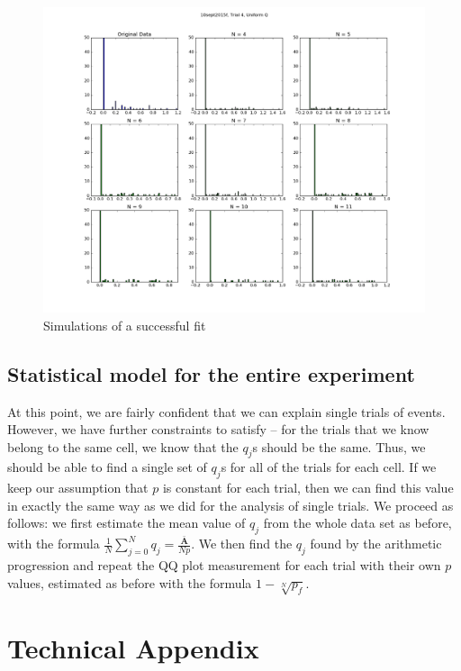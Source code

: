 \documentclass{article}
\newcommand{\rv}[1] {
\text{$\bm{#1}$}
}
\begin{document}
\begin{figure}[h]
  \centering
  \caption{Simulations of a successful fit}
  \includegraphics[width=1.0\textwidth]{10sept2015f-4-uq}
\end{figure}

\subsection{Statistical model for the entire experiment}
At this point, we are fairly confident that we can explain single trials of events. However, we have further constraints to satisfy -- for the trials that we know belong to the same cell, we know that the $q_j$s should be the same. Thus, we should be able to find a single set of $q_j$s for all of the trials for each cell. If we keep our assumption that $p$ is constant for each trial, then we can find this value in exactly the same way as we did for the analysis of single trials. We proceed as follows: we first estimate the mean value of $q_j$ from the whole data set as before, with the formula $\frac{1}{N}\sum_{j=0}^N q_j = \frac{\rv{\bar{A}}}{Np}$. We then find the $q_j$ found by the arithmetic progression and repeat the QQ plot measurement for each trial with their own $p$ values, estimated as before with the formula $1 - \sqrt[N]{p_f}$.

\section{Technical Appendix}
\end{document}
